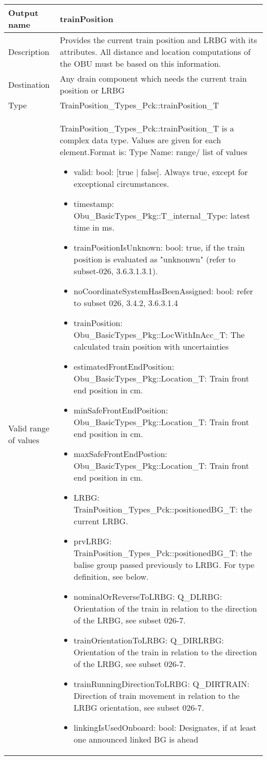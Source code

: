 \begin{longtable}{p{}p{}}
\toprule
Output name				& trainPosition \\

\midrule
Description				& Provides the current train position and LRBG with its attributes. All distance and location computations of the OBU must be based on this information. \newline
  \\
\midrule
Destination				& Any drain component which needs the current train position or  LRBG \\ 
\midrule
Type					& TrainPosition\_Types\_Pck::trainPosition\_T \\  
\midrule
Valid range of values	& TrainPosition\_Types\_Pck::trainPosition\_T is a complex data type. Values are given for each element.\newline Format is: Type Name: range/ list of values
\begin{itemize}
\item valid: bool: [true | false]. Always true, except for exceptional circumstances.
\item timestamp: Obu\_BasicTypes\_Pkg::T\_internal\_Type: latest time in ms. 
\item trainPositionIsUnknown: bool: true, if the train position is evaluated as "unknonwn" (refer to subset-026, 3.6.3.1.3.1). 
\item noCoordinateSystemHasBeenAssigned: bool: refer to subset 026, 3.4.2, 3.6.3.1.4
\item trainPosition: Obu\_BasicTypes\_Pkg::LocWithInAcc\_T: The calculated train position with uncertainties
\item estimatedFrontEndPosition: Obu\_BasicTypes\_Pkg::Location\_T: Train front end position in cm.
\item minSafeFrontEndPosition: Obu\_BasicTypes\_Pkg::Location\_T: Train front end position in cm.
\item maxSafeFrontEndPostion: Obu\_BasicTypes\_Pkg::Location\_T: Train front end position in cm.
\item LRBG: TrainPosition\_Types\_Pck::positionedBG\_T: the current LRBG. 
\item prvLRBG: TrainPosition\_Types\_Pck::positionedBG\_T: the balise group passed previously to LRBG. For type definition, see below.
\item nominalOrReverseToLRBG: Q\_DLRBG: Orientation of the train in relation to the direction of the LRBG, see subset 026-7.
\item trainOrientationToLRBG: Q\_DIRLRBG: Orientation of the train in relation to the direction of the LRBG, see subset 026-7.
\item trainRunningDirectionToLRBG: Q\_DIRTRAIN: Direction of train movement in relation to the LRBG orientation, see subset 026-7.
\item linkingIsUsedOnboard: bool: Designates, if at least one announced linked BG is ahead


\end{itemize}
\end{longtable}
